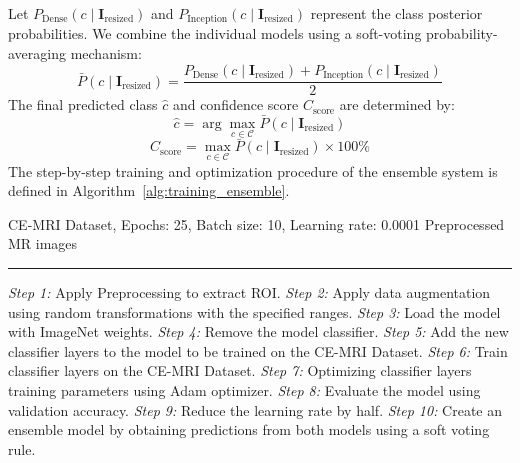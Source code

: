 \documentclass[journal,twoside]{IEEEtran}
\begin{document}
Let $P_{\text{Dense}}(c \mid \mathbf{I}_{\text{resized}})$ and $P_{\text{Inception}}(c \mid \mathbf{I}_{\text{resized}})$ represent the class posterior probabilities. We combine the individual models using a soft-voting probability-averaging mechanism:
\begin{equation}
\bar{P}(c \mid \mathbf{I}_{\text{resized}}) = \frac{P_{\text{Dense}}(c \mid \mathbf{I}_{\text{resized}}) + P_{\text{Inception}}(c \mid \mathbf{I}_{\text{resized}})}{2}
\end{equation}
The final predicted class $\hat{c}$ and confidence score $C_{\text{score}}$ are determined by:
\begin{equation}
\hat{c} = \arg\max_{c \in \mathcal{C}} \bar{P}(c \mid \mathbf{I}_{\text{resized}})
\end{equation}
\begin{equation}
C_{\text{score}} = \max_{c \in \mathcal{C}} \bar{P}(c \mid \mathbf{I}_{\text{resized}}) \times 100\%
\end{equation}
The step-by-step training and optimization procedure of the ensemble system is defined in Algorithm~\ref{alg:training_ensemble}.

\begin{algorithm}
\caption{Ensemble Brain Tumor Classification Using Transfer Learning}
\label{alg:training_ensemble}
\begin{algorithmic}
\REQUIRE CE-MRI Dataset, Epochs: 25, Batch size: 10, Learning rate: 0.0001
\ENSURE Preprocessed MR images
\hrule
\medskip
\STATE \textit{Step 1:} Apply Preprocessing to extract ROI.
\STATE \textit{Step 2:} Apply data augmentation using random transformations with the specified ranges.
    \STATE \textit{Step 3:} Load the model with ImageNet weights.
    \STATE \textit{Step 4:} Remove the model classifier.
    \STATE \textit{Step 5:} Add the new classifier layers to the model to be trained on the CE-MRI Dataset.
        \STATE \textit{Step 6:} Train classifier layers on the CE-MRI Dataset.
        \STATE \textit{Step 7:} Optimizing classifier layers training parameters using Adam optimizer.
        \STATE \textit{Step 8:} Evaluate the model using validation accuracy.
            \STATE \textit{Step 9:} Reduce the learning rate by half.
        \ENDIF
    \ENDFOR
\ENDFOR
\STATE \textit{Step 10:} Create an ensemble model by obtaining predictions from both models using a soft voting rule.
\end{algorithmic}
\end{algorithm}
\end{document}
